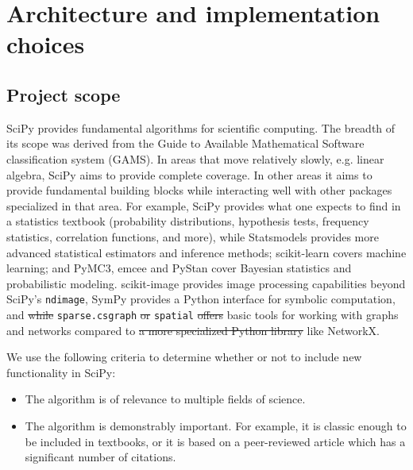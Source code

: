 \documentclass[fleqn,10pt]{wlscirep}
\providecommand{\DIFadd}[1]{{\protect\color{blue}\uwave{#1}}} %
\providecommand{\DIFdel}[1]{{\protect\color{red}\sout{#1}}}                      %
\providecommand{\DIFaddbegin}{} %
\providecommand{\DIFaddend}{} %
\providecommand{\DIFdelbegin}{} %
\providecommand{\DIFdelend}{} %
\begin{document}
\section*{Architecture and implementation choices}
\subsection*{Project scope}

SciPy provides fundamental algorithms for scientific computing. The
breadth of its scope was derived from the Guide to Available Mathematical
Software classification system (GAMS\cite{boisvert1991guide}). In areas
that move relatively slowly, e.g. linear algebra, SciPy aims to provide
complete coverage. In other areas it aims to provide fundamental building
blocks while interacting well with other packages specialized in that area.
For example, SciPy provides what one expects to find in a
statistics textbook (probability distributions, hypothesis tests, frequency
statistics, correlation functions, and more), while
Statsmodels\cite{statsmodels2010} provides
more advanced statistical estimators and inference methods;
scikit-learn\cite{pedregosa2011scikit} covers machine learning; and
PyMC3\cite{10.7717/peerj-cs.55}, emcee\cite{2013PASP-emcee} and
PyStan\cite{pystan-ref} cover Bayesian statistics and probabilistic modeling.
scikit-image\cite{vanderwalt2014scikit} provides image processing
capabilities beyond SciPy's \texttt{ndimage}, SymPy\cite{meurer2017sympy}
provides a Python interface for symbolic computation, and \DIFdelbegin \DIFdel{while }\DIFdelend \texttt{sparse.csgraph}
\DIFdelbegin \DIFdel{or }\DIFdelend \DIFaddbegin \DIFadd{and }\DIFaddend \texttt{spatial} \DIFdelbegin \DIFdel{offers }\DIFdelend \DIFaddbegin \DIFadd{offer }\DIFaddend basic tools
for working with graphs and networks compared to \DIFdelbegin \DIFdel{a more specialized
Python library }\DIFdelend \DIFaddbegin \DIFadd{specialized
libraries }\DIFaddend like NetworkX\cite{hagberg2008networkx}.


We use the following criteria to determine whether or not to include new
functionality in SciPy:
\begin{itemize}
    \item The algorithm is of relevance to multiple fields of science.
    \item The algorithm is demonstrably important.  For example, it is classic
    enough to be included in textbooks, or it is based on a peer-reviewed article
    which has a significant number of citations.
\end{itemize}
\end{document}

